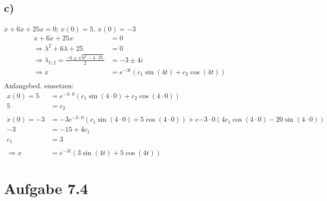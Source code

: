 \documentclass{theozettel}
\begin{document}
\subsection*{c)}$\ddot{x}+6\dot{x}+25x=0$; $x\left(0\right)=5, \ \dot{x}\left(0\right)=-3$
\begin{align*}
\ddot{x}+6\dot{x}+25x&=0\\
\Rightarrow \lambda^2+6\lambda +25&=0\\
\Rightarrow\lambda_{1;2}=\frac{-6\pm\sqrt{6^2-4\cdot 25}}{2}&=-3\pm 4i\\
\Rightarrow x&=e^{-3t}\left(c_1\sin\left(4t\right)+c_2\cos\left(4t\right)\right)\\
\end{align*}
Anfangsbed. einsetzen:
\begin{align*}
x\left(0\right)=5&=e^{-3\cdot 0}\left(c_1\sin\left(4\cdot 0\right)+c_2\cos\left(4\cdot 0\right)\right)\\
5&=c_2\\\\
\dot{x}\left(0\right)=-3&=-3e^{-3\cdot 0}\left(c_1\sin\left(4\cdot 0\right)+5\cos\left(4\cdot 0\right)\right)+e{-3\cdot 0}\left(4c_1\cos\left(4\cdot 0\right)-20\sin\left(4\cdot 0\right)\right)\\
-3&=-15+4c_1\\
c_1&=3\\\\
\Rightarrow x&=e^{-3t}\left(3\sin\left(4t\right)+5\cos\left(4t\right)\right)
\end{align*}
\section*{Aufgabe 7.4} 
\end{document}

